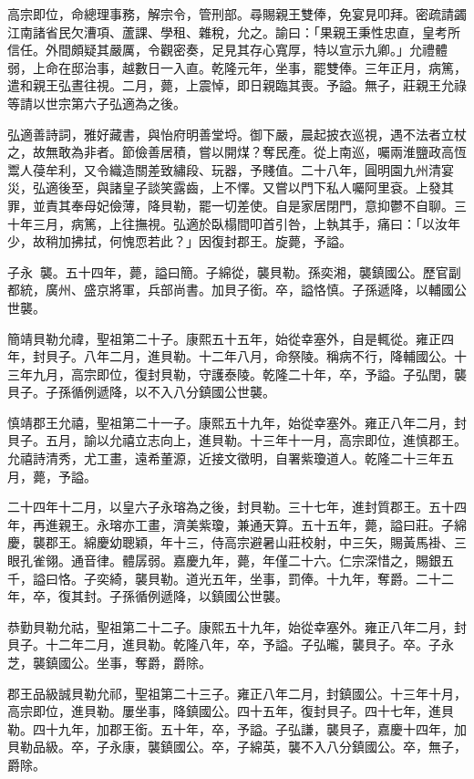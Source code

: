 \begin{pinyinscope}
高宗即位，命總理事務，解宗令，管刑部。尋賜親王雙俸，免宴見叩拜。密疏請蠲江南諸省民欠漕項、蘆課、學租、雜稅，允之。諭曰：「果親王秉性忠直，皇考所信任。外間頗疑其嚴厲，令觀密奏，足見其存心寬厚，特以宣示九卿。」允禮體弱，上命在邸治事，越數日一入直。乾隆元年，坐事，罷雙俸。三年正月，病篤，遣和親王弘晝往視。二月，薨，上震悼，即日親臨其喪。予謚。無子，莊親王允祿等請以世宗第六子弘適為之後。

弘適善詩詞，雅好藏書，與怡府明善堂埒。御下嚴，晨起披衣巡視，遇不法者立杖之，故無敢為非者。節儉善居積，嘗以開煤？奪民產。從上南巡，囑兩淮鹽政高恆鬻人葠牟利，又令織造關差致繡段、玩器，予賤值。二十八年，圓明園九州清宴災，弘適後至，與諸皇子談笑露齒，上不懌。又嘗以門下私人囑阿里袞。上發其罪，並責其奉母妃儉薄，降貝勒，罷一切差使。自是家居閉門，意抑鬱不自聊。三十年三月，病篤，上往撫視。弘適於臥榻間叩首引咎，上執其手，痛曰：「以汝年少，故稍加拂拭，何愧恧若此？」因復封郡王。旋薨，予謚。

子永，襲。五十四年，薨，謚曰簡。子綿從，襲貝勒。孫奕湘，襲鎮國公。歷官副都統，廣州、盛京將軍，兵部尚書。加貝子銜。卒，謚恪慎。子孫遞降，以輔國公世襲。

簡靖貝勒允禕，聖祖第二十子。康熙五十五年，始從幸塞外，自是輒從。雍正四年，封貝子。八年二月，進貝勒。十二年八月，命祭陵。稱病不行，降輔國公。十三年九月，高宗即位，復封貝勒，守護泰陵。乾隆二十年，卒，予謚。子弘閏，襲貝子。子孫循例遞降，以不入八分鎮國公世襲。

慎靖郡王允禧，聖祖第二十一子。康熙五十九年，始從幸塞外。雍正八年二月，封貝子。五月，諭以允禧立志向上，進貝勒。十三年十一月，高宗即位，進慎郡王。允禧詩清秀，尤工畫，遠希董源，近接文徵明，自署紫瓊道人。乾隆二十三年五月，薨，予謚。

二十四年十二月，以皇六子永瑢為之後，封貝勒。三十七年，進封質郡王。五十四年，再進親王。永瑢亦工畫，濟美紫瓊，兼通天算。五十五年，薨，謚曰莊。子綿慶，襲郡王。綿慶幼聰穎，年十三，侍高宗避暑山莊校射，中三矢，賜黃馬褂、三眼孔雀翎。通音律。體孱弱。嘉慶九年，薨，年僅二十六。仁宗深惜之，賜銀五千，謚曰恪。子奕綺，襲貝勒。道光五年，坐事，罰俸。十九年，奪爵。二十二年，卒，復其封。子孫循例遞降，以鎮國公世襲。

恭勤貝勒允祜，聖祖第二十二子。康熙五十九年，始從幸塞外。雍正八年二月，封貝子。十二年二月，進貝勒。乾隆八年，卒，予謚。子弘曨，襲貝子。卒。子永芝，襲鎮國公。坐事，奪爵，爵除。

郡王品級誠貝勒允祁，聖祖第二十三子。雍正八年二月，封鎮國公。十三年十月，高宗即位，進貝勒。屢坐事，降鎮國公。四十五年，復封貝子。四十七年，進貝勒。四十九年，加郡王銜。五十年，卒，予謚。子弘謙，襲貝子，嘉慶十四年，加貝勒品級。卒，子永康，襲鎮國公。卒，子綿英，襲不入八分鎮國公。卒，無子，爵除。


\end{pinyinscope}
